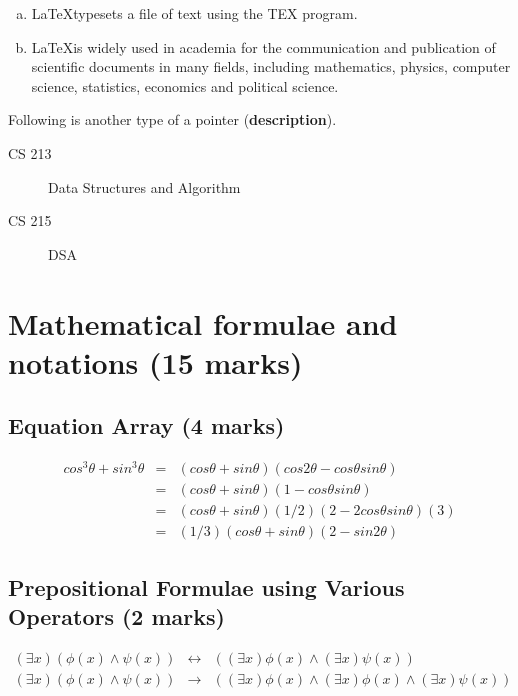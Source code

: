 \documentclass[12pt]{article}
\newcommand{\LATEX}{\LaTeX}
\begin{document}
\begin{enumerate}[(a)]
\item \LATEX typesets a file of text using the TEX program.
\item \LATEX is widely used in academia for the communication and publication
of scientific documents in many fields, including mathematics, physics,
computer science, statistics, economics and political science.
\end{enumerate}

Following is another type of a pointer (\textbf{description}).


\begin{description}
\item [CS 213] Data Structures and Algorithm
\item [CS 215] DSA
\end{description} 


\section{Mathematical formulae and notations (15 marks)}

\subsection{Equation Array (4 marks)}

\begin{eqnarray} \label{eq1}
cos^3\theta + sin^3\theta & = & (cos\theta + sin\theta)(cos2\theta - cos\theta sin\theta) \\
& = & (cos\theta + sin\theta)(1 - cos\theta sin\theta) \\
& = & (cos\theta + sin\theta)(1/2)(2 - 2cos\theta sin\theta)(3) \\
& = & (1/3)(cos\theta + sin\theta)(2-sin2\theta)
\end{eqnarray}

\subsection{Prepositional Formulae using Various Operators (2 marks)}
\begin{eqnarray*}
(\exists x) (\phi(x)\wedge\psi(x)) & \longleftrightarrow & ((\exists x) \phi(x) \wedge (\exists x) \psi(x)) \\
(\exists x)  (\phi(x) \wedge \psi(x)) & \longrightarrow & ((\exists x) \phi(x) \wedge (\exists x) \phi(x) \wedge (\exists x) \psi(x))
\end{eqnarray*}
\end{document}
